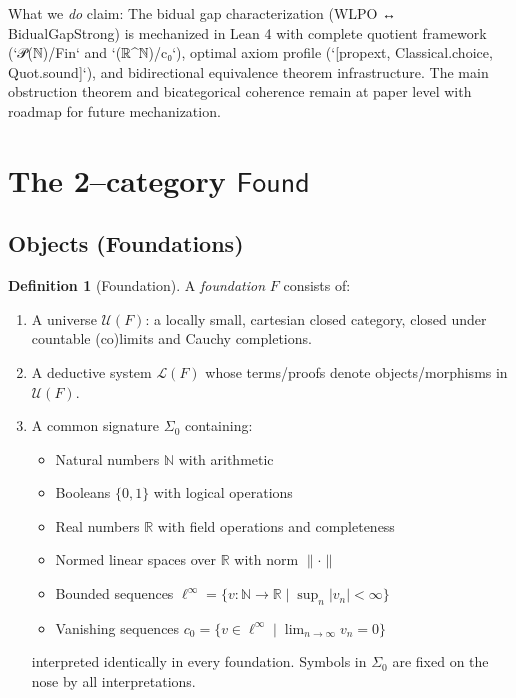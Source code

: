\documentclass[11pt]{article}
\theoremstyle{definition}
\newtheorem{definition}[theorem]{Definition}
\theoremstyle{remark}
\newcommand{\N}{\mathbb{N}}
\newcommand{\R}{\mathbb{R}}
\newcommand{\cnull}{c_0}
\newcommand{\linf}{\ell^\infty}
\newcommand{\Found}{\mathsf{Found}}
\begin{document}
What we \emph{do} claim: The bidual gap characterization (WLPO ↔ BidualGapStrong) is mechanized in Lean 4 with complete quotient framework (`𝒫(ℕ)/Fin` and `(ℝ^ℕ)/c₀`), optimal axiom profile (`[propext, Classical.choice, Quot.sound]`), and bidirectional equivalence theorem infrastructure. The main obstruction theorem and bicategorical coherence remain at paper level with roadmap for future mechanization.

\section{The 2--category \texorpdfstring{$\Found$}{Found}}\label{sec:Found}

\subsection{Objects (Foundations)}\label{ssec:Found-objects}

\begin{definition}[Foundation]\label{def:foundation}
A \emph{foundation} \(F\) consists of:
\begin{enumerate}[label=\textnormal{(O\arabic*)}]
\item A universe \(\mathcal U(F)\): a locally small, cartesian closed category, closed under countable (co)limits and Cauchy completions.
\item A deductive system \(\mathcal L(F)\) whose terms/proofs denote objects/morphisms in \(\mathcal U(F)\).
\item A common signature \(\Sigma_0\) containing:
  \begin{itemize}
  \item Natural numbers \(\N\) with arithmetic
  \item Booleans \(\{0,1\}\) with logical operations
  \item Real numbers \(\R\) with field operations and completeness
  \item Normed linear spaces over \(\R\) with norm \(\|\cdot\|\)
  \item Bounded sequences \(\linf = \{v: \N \to \R \mid \sup_n |v_n| < \infty\}\)
  \item Vanishing sequences \(\cnull = \{v \in \linf \mid \lim_{n \to \infty} v_n = 0\}\)
  \end{itemize}
  interpreted identically in every foundation. Symbols in \(\Sigma_0\) are fixed on the nose by all interpretations.
\end{enumerate}
\end{definition}
\end{document}
